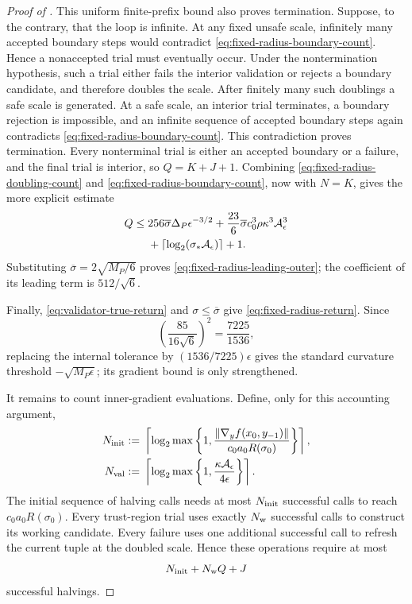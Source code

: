 \documentclass{article}
\begin{document}
\begin{proof}[Proof of ]
This uniform finite-prefix bound also proves termination.  Suppose, to
the contrary, that the loop is infinite.  At any fixed unsafe scale,
infinitely many accepted boundary steps would contradict
\eqref{eq:fixed-radius-boundary-count}.  Hence a nonaccepted trial must
eventually occur.  Under the nontermination hypothesis, such a trial
either fails the interior validation or rejects a boundary candidate,
and therefore doubles the scale.  After finitely many such doublings a
safe scale is generated.  At a safe scale, an interior trial terminates,
a boundary rejection is impossible, and an infinite sequence of
accepted boundary steps again contradicts
\eqref{eq:fixed-radius-boundary-count}.  This contradiction proves
termination.
Every nonterminal trial is either an accepted boundary or a failure,
and the final trial is interior, so $Q=K+J+1$.  Combining
\eqref{eq:fixed-radius-doubling-count} and
\eqref{eq:fixed-radius-boundary-count}, now with $N=K$, gives the more
explicit estimate
\begin{align}
 Q\le{}&256\overline\sigma\Delta_P\epsilon^{-3/2}
 +\frac{23}{6}\overline\sigma
   c_0^3\rho\kappa^3\mathcal A_\epsilon^3
 \notag\\
 &+\left\lceil\log_2(\sigma_*\mathcal A_\epsilon)\right\rceil+1.
 \label{eq:fixed-radius-explicit-outer-count}
\end{align}
Substituting $\overline\sigma=2\sqrt{M_P/6}$ proves
\eqref{eq:fixed-radius-leading-outer}; the coefficient of its leading
term is $512/\sqrt6$.

Finally, \eqref{eq:validator-true-return} and
$\sigma\le\overline\sigma$ give
\eqref{eq:fixed-radius-return}.  Since
\[
 \left(\frac{85}{16\sqrt6}\right)^2=\frac{7225}{1536},
\]
replacing the internal tolerance by $(1536/7225)\epsilon$ gives the
standard curvature threshold $-\sqrt{M_P\epsilon}$; its gradient
bound is only strengthened.

It remains to count inner-gradient evaluations.  Define, only for this
accounting argument,
\begin{align}
 N_{\rm init}
 &:={}
 \left\lceil
  \log_2\max\left\{1,
   \frac{\|\nabla_yf(x_0,y_{-1})\|}
        {c_0a_0R(\sigma_0)}
  \right\}
 \right\rceil,
 \label{eq:initial-half-count}\\
 N_{\rm val}
 &:={}
 \left\lceil
  \log_2\max\left\{1,
   \frac{\kappa\mathcal A_\epsilon}{4\epsilon}
  \right\}
 \right\rceil.
 \label{eq:validation-half-count}
\end{align}
The initial sequence of halving calls needs at most
$N_{\rm init}$ successful calls to reach
$c_0a_0R(\sigma_0)$.  Every trust-region trial uses exactly
$N_{\rm w}$ successful calls to construct its working candidate.
Every failure uses one additional successful call to refresh the
current tuple at the doubled scale.  Hence these operations require at
most
\[
 N_{\rm init}+N_{\rm w}Q+J
\]
successful halvings.


\end{proof}
\end{document}
